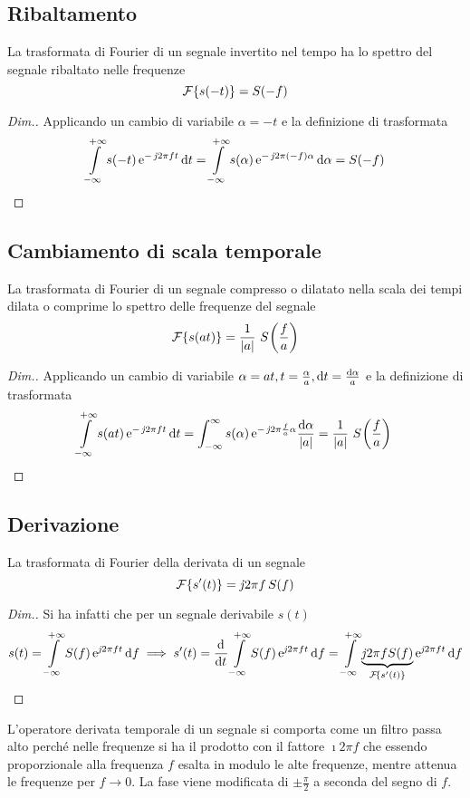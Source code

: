 \subsection{Ribaltamento}
La trasformata di Fourier di un segnale invertito nel tempo ha lo spettro del segnale ribaltato nelle frequenze
\begin{equation}\operatorname{\mathcal{F}}\!\left\lbrace{s(-t)}\right\rbrace=S(-f)\end{equation}
\begin{proof}[Dim.]
	Applicando un cambio di variabile $\alpha=-t$ e la definizione di trasformata
\[\int\limits_{-\infty}^{+\infty}{s(-t)\operatorname{e}^{-\operatorname{\mathit{j}\!} 2\pi f t}}{\,\mathop{}\!\mathrm{d}{t}}=
\int\limits_{-\infty}^{+\infty}{s(\alpha)\operatorname{e}^{-\operatorname{\mathit{j}\!} 2\pi (-f)\alpha}}{\,\mathop{}\!\mathrm{d}{\alpha}}=S(-f)\qedhere\]
\end{proof}

\subsection{Cambiamento di scala temporale}
La trasformata di Fourier di un segnale compresso o dilatato nella scala dei tempi dilata o comprime lo spettro delle frequenze del segnale
\begin{equation}\label{eq:trasf_Fourier_scala}
\operatorname{\mathcal{F}}\!\left\lbrace{s(a t)}\right\rbrace=\frac{1}{\left|{a}\right|}\,\,{S}^{}\!\left({\frac{f}{a}}\right)
\end{equation}
\begin{proof}[Dim.] Applicando un cambio di variabile $\alpha=a t, t=\frac{\alpha}{a}, \mathop{}\!\mathrm{d} t=\frac{\mathop{}\!\mathrm{d}\alpha}{a}$ e la definizione di trasformata
\[\int\limits_{-\infty}^{+\infty}{s(a t)\operatorname{e}^{-\operatorname{\mathit{j}\!} 2\pi f t}}{\,\mathop{}\!\mathrm{d}{t}}=
\int_{-\infty}^{\infty}{s(\alpha)\operatorname{e}^{-\operatorname{\mathit{j}\!} 2\pi\frac{f}{a}\alpha}}{\frac{\mathop{}\!\mathrm{d}\alpha}{\left|{a}\right|}}=\frac{1}{\left|{a}\right|}\,\,{S}^{}\!\left({\frac{f}{a}}\right)\qedhere\]
\end{proof}

\subsection{Derivazione}
La trasformata di Fourier della derivata di un segnale
\begin{equation}
\operatorname{\mathcal{F}}\!\left\lbrace{s'(t)}\right\rbrace=\operatorname{\mathit{j}\!} 2\pi f\,S(f)
\end{equation}
\begin{proof}[Dim.] Si ha infatti che per un segnale derivabile $s(t)$
\[s(t)=\intinf{S(f)\e{\imath 2\pi f t}}{f}\implies s'(t)=\deriv{}{t}\intinf{S(f)\e{\imath 2\pi f t}}{f}=
\intinf{ \underbrace{\imath 2\pi f S(f)}_{\fourier{s'(t)}}\e{\imath 2\pi f t}}{f}\qedhere\]
\end{proof}

\begin{nota}L'operatore derivata temporale di un segnale si comporta come un filtro passa alto perché nelle frequenze si ha il prodotto con il fattore $\imath 2\pi f$ che essendo proporzionale alla frequenza $f$ esalta in modulo le alte frequenze, mentre attenua le frequenze per $f\to 0$. La fase viene modificata di $\pm\frac{\pi}{2}$ a seconda del segno di $f$.\end{nota}

